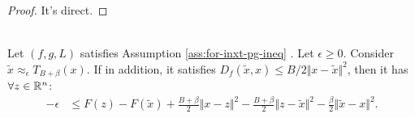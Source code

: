 \documentclass[12pt]{article}
\begin{document}
        \begin{proof}
            It's direct. 
        \end{proof}
        \begin{theorem}\;\label{thm:inxt-pg-ineq}\\
            Let $(f, g, L)$ satisfies Assumption \ref{ass:for-inxt-pg-ineq} . 
            Let $\epsilon \ge 0$. 
            Consider $\tilde x \approx_\epsilon T_{B + \beta}(x)$. 
            If in addition, it satisfies $D_f(\tilde x, x) \le B/2\Vert x - \tilde x\Vert^2$, then it has $\forall z \in \mathbb R^n$: 
            \begin{align*}
                - \epsilon &\le 
                F(z) - F(\tilde x)
                + \frac{B + \beta}{2}\Vert x - z\Vert^2
                - \frac{B + \beta}{2}\Vert z - \tilde x\Vert^2
                - \frac{\beta}{2}\Vert \tilde x - x\Vert^2. 
            \end{align*}
        \end{theorem}
\end{document}
